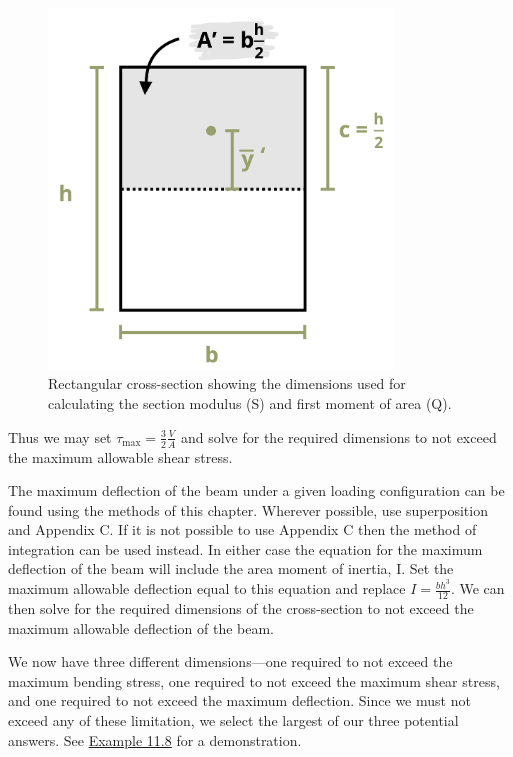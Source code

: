 \documentclass[
  letterpaper,
  DIV=11,
  numbers=noendperiod]{scrreprt}
\theoremstyle{definition}
\theoremstyle{remark}
\begin{document}
\begin{figure}

{\centering \includegraphics[width=3.60417in,height=\textheight]{images/CH11 PNGs/11.8.png}

}

\caption{Rectangular cross-section showing the dimensions used for
calculating the section modulus (S) and first moment of area (Q).}

\end{figure}%

Thus we may set \(\tau_{\max }=\frac{3}{2} \frac{V}{A}\) and solve for
the required dimensions to not exceed the maximum allowable shear
stress.

The maximum deflection of the beam under a given loading configuration
can be found using the methods of this chapter. Wherever possible, use
superposition and Appendix C. If it is not possible to use Appendix C
then the method of integration can be used instead. In either case the
equation for the maximum deflection of the beam will include the area
moment of inertia, I. Set the maximum allowable deflection equal to this
equation and replace \(I=\frac{b h^{3}}{12}\). We can then solve for the
required dimensions of the cross-section to not exceed the maximum
allowable deflection of the beam.

We now have three different dimensions---one required to not exceed the
maximum bending stress, one required to not exceed the maximum shear
stress, and one required to not exceed the maximum deflection. Since we
must not exceed any of these limitation, we select the largest of our
three potential answers. See \hyperref[example-11.8]{Example 11.8} for a
demonstration.
\end{document}
